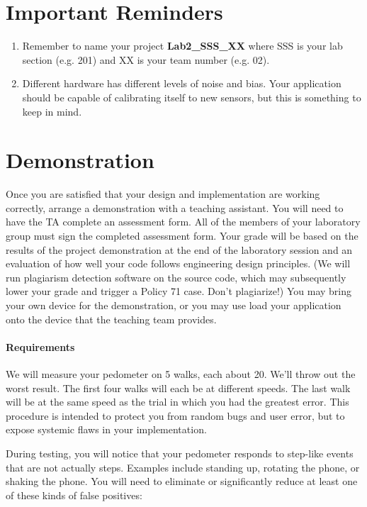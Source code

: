 \documentclass[10pt]{article}
\begin{document}
\section{Important Reminders}
\begin{enumerate}
\item Remember to name your project \textbf{Lab2\_SSS\_XX} where SSS is your lab section (e.g. 201) and XX is your team number (e.g. 02). 
\item Different hardware has different levels of noise and bias. Your application should be capable of calibrating itself to new sensors, but this is something to keep in mind.
\end{enumerate}

\section{Demonstration}
Once you are satisfied that your design and implementation are working correctly, arrange a demonstration with a teaching assistant.  You will need to have the TA complete an assessment form.  All of the members of your laboratory group must sign the completed assessment form.  Your grade will be based on the results of the project demonstration at the end of the laboratory session and an evaluation of how well your code follows engineering design principles. (We will run plagiarism detection software on the source code, which may subsequently lower your grade and trigger a Policy 71 case. Don't plagiarize!) You may bring your own device for the demonstration, or you may use load your application onto the device that the teaching team provides.

\paragraph{Requirements}

We will measure your pedometer on 5 walks, each about 20. We'll throw out the worst result. The first four walks will each be at different speeds. The last walk will be at the same speed as the trial in which you had the greatest error. This procedure is intended to protect you from random bugs and user error, but to expose systemic flaws in your implementation.

During testing, you will notice that your pedometer responds to step-like events that are not actually steps. Examples include standing up, rotating the phone, or shaking the phone. You will need to eliminate or significantly reduce at least one of these kinds of false positives:
\end{document}
